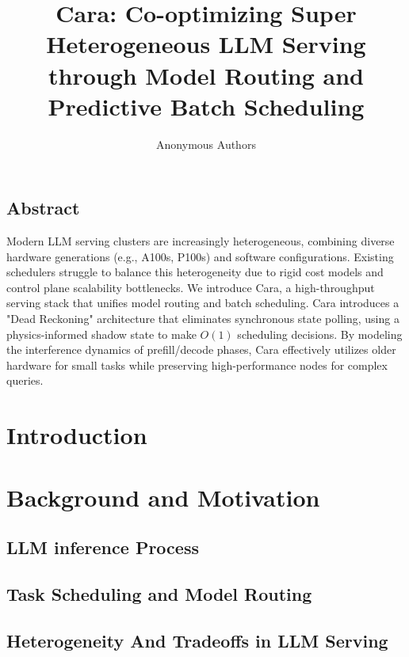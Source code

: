 \documentclass[letterpaper, anonymous, twocolumn, 10pt]{article}
\begin{document}
\date{}

\title{\Large \bf Cara: Co-optimizing Super Heterogeneous LLM Serving through Model Routing and Predictive Batch Scheduling}

\author{{\rm Anonymous Authors}}

\maketitle

\subsection*{Abstract}
Modern LLM serving clusters are increasingly heterogeneous, combining diverse hardware generations (e.g., A100s, P100s) and software configurations. Existing schedulers struggle to balance this heterogeneity due to rigid cost models and control plane scalability bottlenecks. We introduce Cara, a high-throughput serving stack that unifies model routing and batch scheduling. Cara introduces a "Dead Reckoning" architecture that eliminates synchronous state polling, using a physics-informed shadow state to make $O(1)$ scheduling decisions. By modeling the interference dynamics of prefill/decode phases, Cara effectively utilizes older hardware for small tasks while preserving high-performance nodes for complex queries.

\section{Introduction} \label{section:introduction}

\section{Background and Motivation} \label{section:motivation}

\subsection{LLM inference Process} \label{section:llm_inference_processes}
\subsection{Task Scheduling and Model Routing}
\subsection{Heterogeneity And Tradeoffs in LLM Serving}\label{section:heterogenity}
\end{document}
